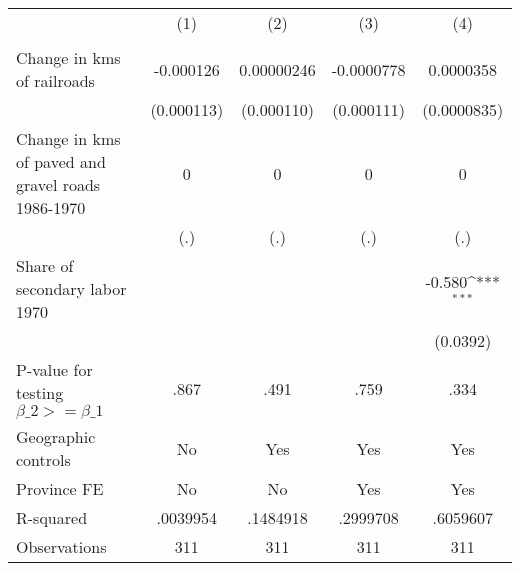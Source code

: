{
\def\sym#1{\ifmmode^{#1}\else\(^{#1}\)\fi}
\begin{tabular}{l*{4}{c}}
\hline\hline
                &\multicolumn{1}{c}{(1)}&\multicolumn{1}{c}{(2)}&\multicolumn{1}{c}{(3)}&\multicolumn{1}{c}{(4)}\\
                &\multicolumn{1}{c}{}&\multicolumn{1}{c}{}&\multicolumn{1}{c}{}&\multicolumn{1}{c}{}\\
\hline
Change in kms of railroads&-0.000126         &0.00000246         &-0.0000778         &0.0000358         \\
                &(0.000113)         &(0.000110)         &(0.000111)         &(0.0000835)         \\
[1em]
Change in kms of paved and gravel roads 1986-1970&        0         &        0         &        0         &        0         \\
                &      (.)         &      (.)         &      (.)         &      (.)         \\
[1em]
Share of secondary labor 1970&                  &                  &                  &   -0.580\sym{***}\\
                &                  &                  &                  & (0.0392)         \\
\hline
P-value for testing $\beta\_{2} >= \beta\_{1}$&     .867         &     .491         &     .759         &     .334         \\
Geographic controls&       No         &      Yes         &      Yes         &      Yes         \\
Province FE     &       No         &       No         &      Yes         &      Yes         \\
R-squared       & .0039954         & .1484918         & .2999708         & .6059607         \\
Observations    &      311         &      311         &      311         &      311         \\
\hline\hline
\end{tabular}
}
